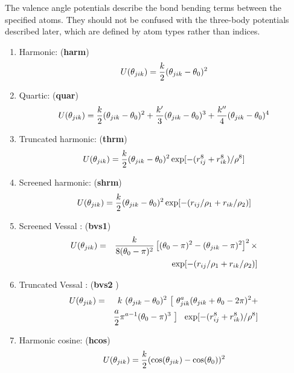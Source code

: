 The valence angle potentials
describe the bond bending terms between the specified atoms.  They
should not be confused with the
three-body potentials described later,
which are defined by atom types rather than indices.
\begin{enumerate}
\item Harmonic:  ({\bf harm})
\begin{equation}
 U(\theta_{jik}) = {k \over 2} (\theta_{jik} - \theta_0)^{2}
\end{equation}
\item Quartic:  ({\bf quar})
\begin{equation}
 U(\theta_{jik}) = {k \over 2}(\theta_{jik} - \theta_0)^{2} + {k' \over
3}(\theta_{jik} - \theta_0)^{3} + {k'' \over 4}(\theta_{jik} -
\theta_0)^{4}
\end{equation}
\item Truncated harmonic:  ({\bf thrm})
\begin{equation}
U(\theta_{jik}) = {k\over 2} (\theta_{jik} - \theta_0)^{2}
\exp[-(r_{ij}^{8} + r_{ik}^{8}) / \rho^{8}]
\end{equation}
\item Screened harmonic:  ({\bf shrm})
\begin{equation}
 U(\theta_{jik}) = {k\over 2} (\theta_{jik} - \theta_0)^{2}
\exp[-(r_{ij} / \rho_1 + r_{ik} / \rho_2)]
\end{equation}
\item Screened Vessal \cite{vessal-94a}:  ({\bf bvs1})
\begin{eqnarray}
U(\theta_{jik})&=&{k \over 8(\theta_{0}-\pi)^{2}} \left[ (\theta_{0}
-\pi)^{2} -(\theta_{jik}-\pi)^{2}\right]^{2} \times \nonumber \\
              & &  \exp[-(r_{ij} / \rho_{1} + r_{ik} / \rho_{2})]
\end{eqnarray}
\item Truncated Vessal \cite{smith-95a}:  ({\bf bvs2 })
\begin{eqnarray}
U(\theta_{jik})&=& k~(\theta_{jik}-\theta_{0})^{2}~
\big[~\theta_{jik}^a (\theta_{jik}+\theta_{0}-2\pi)^{2} + \nonumber \\
& & {a \over 2} \pi^{a-1} (\theta_{0}-\pi)^{3}~\big]~~\exp[-(r_{ij}^{8} + r_{ik}^{8}) / \rho^{8}]
\end{eqnarray}
\item Harmonic cosine:  ({\bf hcos})
\begin{equation}
U(\theta_{jik}) = {k\over 2}(\cos(\theta_{jik})
-\cos(\theta_{0}))^{2}

\end{equation}
\end{enumerate}
